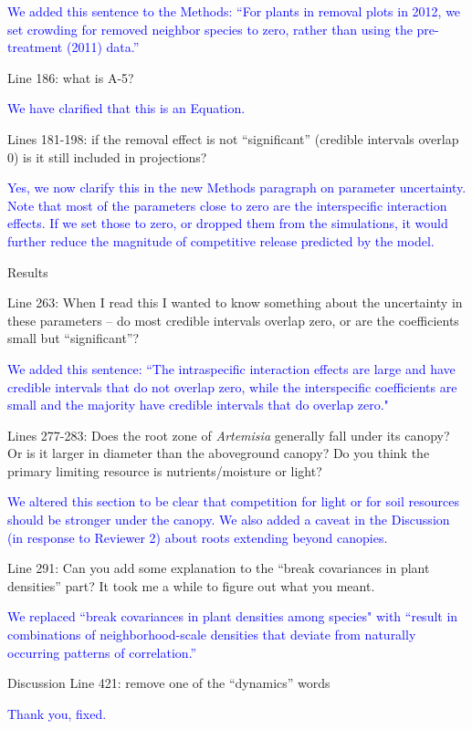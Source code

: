 \documentclass[12pt]{article}
\newcommand{\response}{\textcolor{blue}}
\begin{document}
\response{We added this sentence to the Methods: ``For plants in removal plots in 2012, we set crowding for removed neighbor species to zero, rather than using the pre-treatment (2011) data.''}

Line 186: what is A-5?

\response{We have clarified that this is an Equation.}

Lines 181-198: if the removal effect is not ``significant'' (credible intervals overlap 0) is it still included in projections?

\response{Yes, we now clarify this in the new Methods paragraph on parameter uncertainty. Note that most of the parameters close
to zero are the interspecific interaction effects. If we set those to zero, or dropped them from the simulations, it would further reduce the 
magnitude of competitive release predicted by the model.}

Results

Line 263:  When I read this I wanted to know something about the uncertainty in these parameters – do most credible intervals overlap zero, or are the coefficients small but ``significant''?

\response{We added this sentence: ``The intraspecific interaction effects are large and have credible intervals that do not overlap zero, while the interspecific coefficients are small and the majority have credible intervals that do overlap zero." }

Lines 277-283: Does the root zone of \emph{Artemisia} generally fall under its canopy? Or is it larger in diameter than the aboveground canopy? Do you think the primary limiting resource is nutrients/moisture or light?

\response{We altered this section to be clear that competition for light or for soil resources should be stronger under the canopy. We also added a caveat in the Discussion (in response to Reviewer 2) about roots extending beyond canopies. }

Line 291: Can you add some explanation to the ``break covariances in plant densities'' part? It took me a while to figure out what you meant. 

\response{We replaced ``break covariances in plant densities among species" with ``result in combinations of neighborhood-scale densities that deviate from 
naturally occurring patterns of correlation.''}

Discussion
Line 421: remove one of the ``dynamics” words 

\response{Thank you, fixed.}
\end{document}
